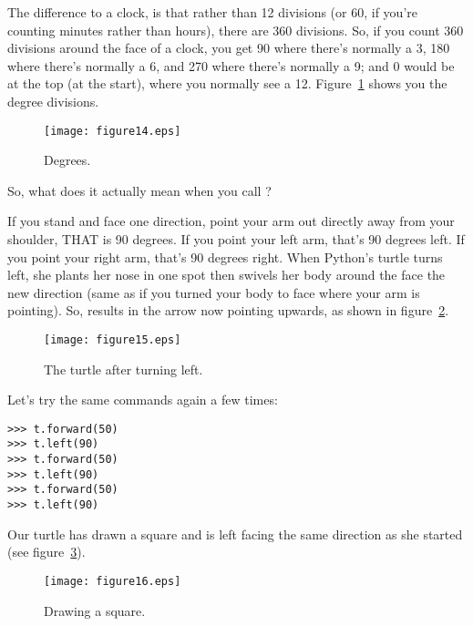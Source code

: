 The difference to a clock, is that rather than 12 divisions (or 60, if you're counting minutes rather than hours), there are 360 divisions.  So, if you count 360 divisions around the face of a clock, you get 90 where there's normally a 3, 180 where there's normally a 6, and 270 where there's normally a 9; and 0 would be at the top (at the start), where you normally see a 12.  Figure~\ref{fig14} shows you the degree divisions.

\begin{figure}
\begin{center}
\texttt{[image: figure14.eps]}
\end{center}
\caption{Degrees.}\label{fig14}
\end{figure}

So, what does it actually mean when you call ?
\par
If you stand and face one direction, point your arm out directly away from your shoulder, THAT is 90 degrees.  If you point your left arm, that's 90 degrees left.  If you point your right arm, that's 90 degrees right.  When Python's turtle turns left, she plants her nose in one spot then swivels her body around the face the new direction (same as if you turned your body to face where your arm is pointing).  So,  results in the arrow now pointing upwards, as shown in figure~\ref{fig15}.

\begin{figure}
\begin{center}
\texttt{[image: figure15.eps]}
\end{center}
\caption{The turtle after turning left.}\label{fig15}
\end{figure}

Let's try the same commands again a few times:

\begin{listing}
\begin{verbatim}
>>> t.forward(50)
>>> t.left(90)
>>> t.forward(50)
>>> t.left(90)
>>> t.forward(50)
>>> t.left(90)
\end{verbatim}
\end{listing}

Our turtle has drawn a square and is left facing the same direction as she started (see figure~\ref{fig16}).

\begin{figure}
\begin{center}
\texttt{[image: figure16.eps]}
\end{center}
\caption{Drawing a square.}\label{fig16}
\end{figure}

